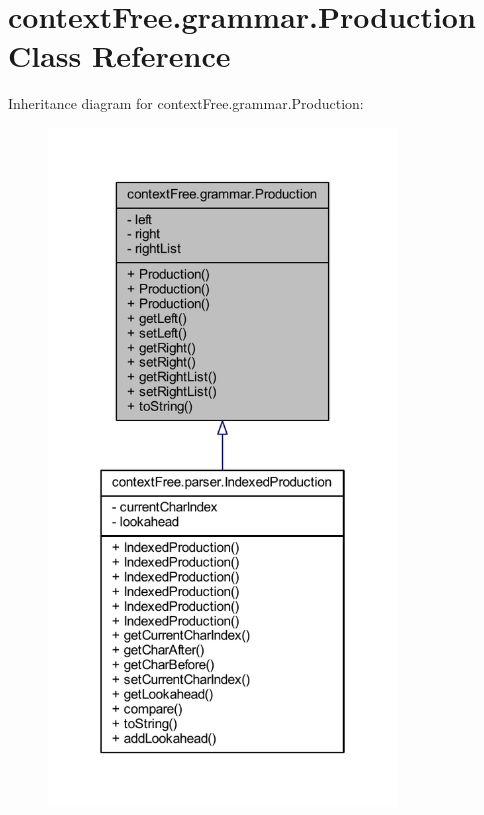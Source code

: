 \hypertarget{classcontext_free_1_1grammar_1_1_production}{\section{context\-Free.\-grammar.\-Production Class Reference}
\label{classcontext_free_1_1grammar_1_1_production}
}


Inheritance diagram for context\-Free.\-grammar.\-Production\-:\nopagebreak
\begin{figure}[H]
\begin{center}
\leavevmode
\includegraphics[width=262pt]{classcontext_free_1_1grammar_1_1_production__inherit__graph}
\end{center}
\end{figure}


